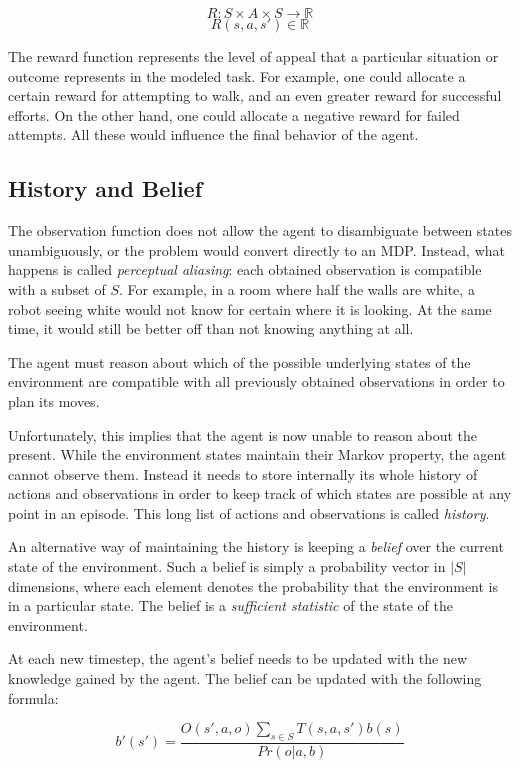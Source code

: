 \[ R: S\times A\times S \rightarrow \mathbb{R} \]
\[ R(s, a, s') \in \mathbb{R} \]

The reward function represents the level of appeal that a particular situation or outcome represents
in the modeled task. For example, one could allocate a certain reward for attempting to walk, and an
even greater reward for successful efforts. On the other hand, one could allocate a negative reward
for failed attempts. All these would influence the final behavior of the agent.

\subsection{History and Belief}

The observation function does not allow the agent to disambiguate between states unambiguously, or
the problem would convert directly to an MDP. Instead, what happens is called \textit{perceptual
aliasing}: each obtained observation is compatible with a subset of $S$. For example, in a room
where half the walls are white, a robot seeing white would not know for certain where it is looking.
At the same time, it would still be better off than not knowing anything at all.

The agent must reason about which of the possible underlying states of the environment are
compatible with all previously obtained observations in order to plan its moves.

Unfortunately, this implies that the agent is now unable to reason about the present. While the
environment states maintain their Markov property, the agent cannot observe them. Instead it needs
to store internally its whole history of actions and observations in order to keep track of which
states are possible at any point in an episode. This long list of actions and observations is called
\textit{history}.

An alternative way of maintaining the history is keeping a \textit{belief} over the current state of
the environment. Such a belief is simply a probability vector in $|S|$ dimensions, where each
element denotes the probability that the environment is in a particular state. The belief is a
\textit{sufficient statistic} of the state of the environment.

At each new timestep, the agent's belief needs to be updated with the new knowledge gained by the
agent. The belief can be updated with the following formula:

\[ b'(s') = \frac{O(s', a, o)\sum_{s\in S}T(s,a,s')b(s)}{Pr(o|a,b)} \]

